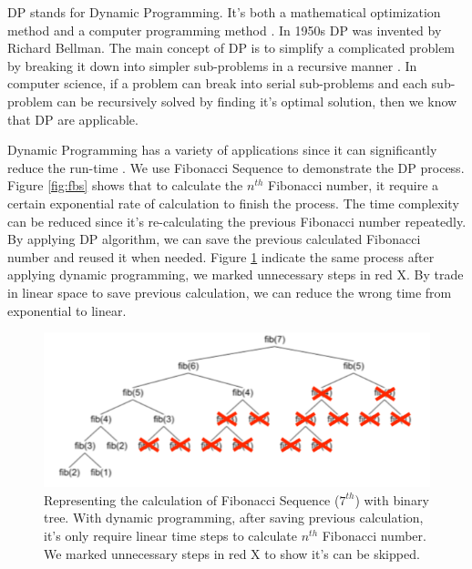 \ac{DP} stands for Dynamic Programming. It's both a mathematical optimization method and a computer programming method \cite{bertsekas2005dynamic}. In 1950s \ac{DP} was invented by Richard Bellman\cite{bellman2013dynamic}. The main concept of \ac{DP} is to simplify a complicated problem by breaking it down into simpler sub-problems in a recursive manner \cite{howard1966dynamic}. In computer science, if a problem can break into serial sub-problems and each sub-problem can be recursively solved by finding it's optimal solution, then we know that \ac{DP} are applicable. 

Dynamic Programming has a variety of applications since it can significantly reduce the run-time \cite{bertsekas1995neuro}. We use Fibonacci Sequence to demonstrate the \ac{DP} process\cite{horadam1961generalized}. Figure \ref{fig:fbs} shows that to calculate the $n^{th}$ Fibonacci number, it require a certain exponential rate of calculation to finish the process. The time complexity can be reduced since it's re-calculating the previous Fibonacci number repeatedly. By applying \ac{DP} algorithm, we can save the previous calculated Fibonacci number and reused it when needed. Figure \ref{fig:fbs_dp} indicate the same process after applying dynamic programming, we marked unnecessary steps in red X. By trade in linear space to save previous calculation, we can reduce the wrong time from exponential to linear.

\begin{figure}
    \centering
    \includegraphics[width=\textwidth]{Figures/QVSdv_DP.png}
    \caption[Demonstration on Fibonacci Sequence with \ac{DP}]{Representing the calculation of Fibonacci Sequence ($7^{th}$) with binary tree. With dynamic programming, after saving previous calculation, it's only require linear time steps to calculate $n^{th}$ Fibonacci number. We marked unnecessary steps in red X to show it's can be skipped.
    }
    \label{fig:fbs_dp}
\end{figure}


